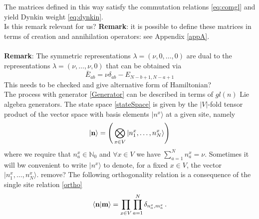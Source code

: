 \documentclass[11pt]{article}
\numberwithin{equation}{section}
\numberwithin{equation}{subsection}
\newcommand{\twoj}{\nu}
\begin{document}
The matrices defined in this way satisfy the commutation relations \eqref{eq:comgl} and yield Dynkin weight \eqref{eq:dynkin}. \\
{\color{red} Is this remark relevant for us?}
\newline 
\textbf{Remark}: it is possible to define these matrices in terms of creation and annihilation operators: see Appendix \ref{appA}.
\\ \\
\textbf{Remark}: The symmetric representations $\lambda=(\twoj,0,\ldots,0)$ are dual to the representations $\lambda=(\twoj,\ldots,\twoj,0)$ that can be obtained via 
\begin{equation}
   \bar E_{ab}=\nu\delta_{ab}-E_{N-b+1,N-a+1}
\end{equation}
{\color{red} This needs to be checked and give alternative form of Hamiltonian?}\\
The process with generator \eqref{Generator} can be described in terms of $gl(n)$ Lie algebra generators. The state space \eqref{stateSpace} is given by the $|V|$-fold tensor product of the vector space with basis elements $|n^x\rangle$ at a given site, namely
\begin{equation}
|{\bf n}\rangle=\left(\,\bigotimes_{x\in V}	|n_{1}^{x},\ldots,n_{N}^{x}\rangle\right)
\end{equation}
{\color{blue}
where we require that $n_{a}^{x}\in \mathbb{N}_{0}$ and $\forall x\in V$ we have $\sum_{a=1}^{N}n_{a}^{x}=\nu$. Sometimes it will bw convenient to write $|n^{x}\rangle$ to denote, for a fixed $x\in V$, the vector $|n_{1}^{x},\ldots,n_{N}^{x}\rangle$.}
{\color{red}remove?}
The following orthogonality relation is a consequence of the single site relation \eqref{ortho}
\begin{equation}
    \langle {\bf n}|{\bf m}\rangle =\prod_{x\in V}\prod_{a=1}^N\delta_{n^x_a,m^{x}_a}\,.
\end{equation}
\end{document}
